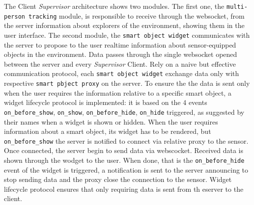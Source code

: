 The Client \emph{Supervisor} architecture shows two modules. The first
one, the {\tt multi-person\ tracking} module, is responsible to
receive through the websocket, from the server information about
explorers of the environment, showing them in the user interface. The
second module, the {\tt smart\ object\ widget} communicates with the
server to propose to the user realtime information about sensor-equipped
objects in the environment. Data passes through the single websocket
opened between the server and every \emph{Supervisor} Client. Rely on a
naive but effective communication protocol, each {\tt smart object widget}
exchange data only with respective {\tt smart pbject proxy} on the server. To
ensure the the data is sent only when the user requires the information
relative to a specific smart object, a widget lifecycle protocol is
implemented: it is based on the 4 events {\tt on\_before\_show},
{\tt on\_show}, {\tt on\_before\_hide}, {\tt on\_hide}
triggered, as suggested by their names when a widget is shown or hidden.
When the user requires information about a smart object, its widget has
to be rendered, but {\tt on\_before\_show} the server is notified to
connect via relative proxy to the sensor. Once connected, the server
begin to send data via webscocket. Received data is shown through the
wodget to the user. When done, that is the {\tt on\_before\_hide} event of the
widget is triggered, a notification is sent to the server announcing to stop sending
data and the proxy close the connection to the sensor. Widget lifecycle
protocol ensures that only requiring data is sent from th eserver to the
client.
